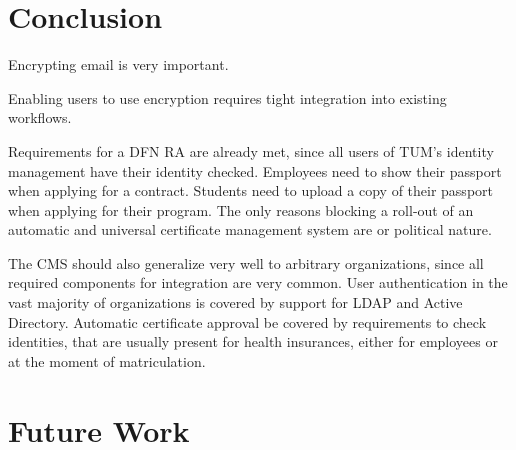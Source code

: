 \begin{abstract}
    
\end{abstract}

\begin{otherlanguage}{ngerman}
    \begin{abstract}
        
    \end{abstract}
\end{otherlanguage}

\setcounter{tocdepth}{1}
\tableofcontents
\listoffigures
\begingroup
\let\clearpage\relax
\listoftables
\lstlistoflistings
\endgroup

\startcontent











\chapter{Conclusion}\label{ch:conclusion}
Encrypting email is very important.

Enabling users to use encryption requires tight integration into existing workflows.

Requirements for a DFN RA are already met, since all users of TUM's identity management have their identity checked.
Employees need to show their passport when applying for a contract.
Students need to upload a copy of their passport when applying for their program.
The only reasons blocking a roll-out of an automatic and universal certificate management system are or political
nature.

The CMS should also generalize very well to arbitrary organizations, since all required components for integration are
very common.
User authentication in the vast majority of organizations is covered by support for LDAP and Active Directory.
Automatic certificate approval be covered by requirements to check identities, that are usually present for health
insurances, either for employees or at the moment of matriculation.

\chapter{Future Work}\label{ch:futureWork}

